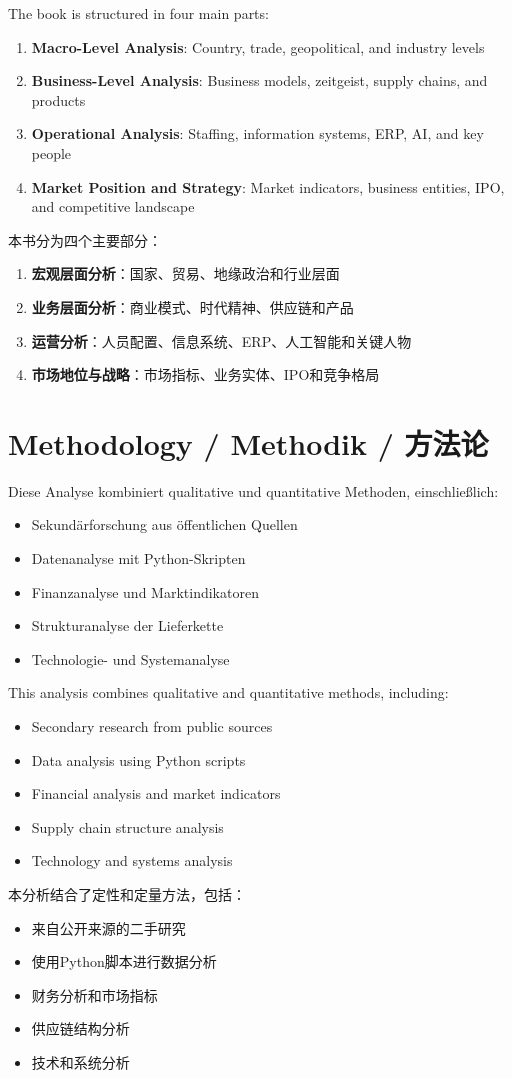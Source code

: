 The book is structured in four main parts:
\begin{enumerate}
    \item \textbf{Macro-Level Analysis}: Country, trade, geopolitical, and industry levels
    \item \textbf{Business-Level Analysis}: Business models, zeitgeist, supply chains, and products
    \item \textbf{Operational Analysis}: Staffing, information systems, ERP, AI, and key people
    \item \textbf{Market Position and Strategy}: Market indicators, business entities, IPO, and competitive landscape
\end{enumerate}

本书分为四个主要部分：
\begin{enumerate}
    \item \textbf{宏观层面分析}：国家、贸易、地缘政治和行业层面
    \item \textbf{业务层面分析}：商业模式、时代精神、供应链和产品
    \item \textbf{运营分析}：人员配置、信息系统、ERP、人工智能和关键人物
    \item \textbf{市场地位与战略}：市场指标、业务实体、IPO和竞争格局
\end{enumerate}

\section{Methodology / Methodik / 方法论}

\begin{otherlanguage}{ngerman}
Diese Analyse kombiniert qualitative und quantitative Methoden, einschließlich:
\begin{itemize}
    \item Sekundärforschung aus öffentlichen Quellen
    \item Datenanalyse mit Python-Skripten
    \item Finanzanalyse und Marktindikatoren
    \item Strukturanalyse der Lieferkette
    \item Technologie- und Systemanalyse
\end{itemize}
\end{otherlanguage}

This analysis combines qualitative and quantitative methods, including:
\begin{itemize}
    \item Secondary research from public sources
    \item Data analysis using Python scripts
    \item Financial analysis and market indicators
    \item Supply chain structure analysis
    \item Technology and systems analysis
\end{itemize}

本分析结合了定性和定量方法，包括：
\begin{itemize}
    \item 来自公开来源的二手研究
    \item 使用Python脚本进行数据分析
    \item 财务分析和市场指标
    \item 供应链结构分析
    \item 技术和系统分析
\end{itemize}
